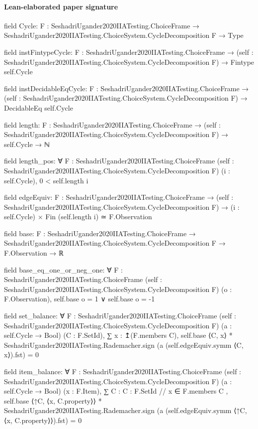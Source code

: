 \documentclass[10pt]{article}
\begin{document}
\paragraph{Lean-elaborated paper signature}
\begin{ReviewVerbatim}
field Cycle:
{F : SeshadriUgander2020IIATesting.ChoiceFrame} → SeshadriUgander2020IIATesting.ChoiceSystem.CycleDecomposition F → Type

field instFintypeCycle:
{F : SeshadriUgander2020IIATesting.ChoiceFrame} →
  (self : SeshadriUgander2020IIATesting.ChoiceSystem.CycleDecomposition F) → Fintype self.Cycle

field instDecidableEqCycle:
{F : SeshadriUgander2020IIATesting.ChoiceFrame} →
  (self : SeshadriUgander2020IIATesting.ChoiceSystem.CycleDecomposition F) → DecidableEq self.Cycle

field length:
{F : SeshadriUgander2020IIATesting.ChoiceFrame} →
  (self : SeshadriUgander2020IIATesting.ChoiceSystem.CycleDecomposition F) → self.Cycle → ℕ

field length_pos:
∀ {F : SeshadriUgander2020IIATesting.ChoiceFrame}
  (self : SeshadriUgander2020IIATesting.ChoiceSystem.CycleDecomposition F) (i : self.Cycle), 0 < self.length i

field edgeEquiv:
{F : SeshadriUgander2020IIATesting.ChoiceFrame} →
  (self : SeshadriUgander2020IIATesting.ChoiceSystem.CycleDecomposition F) →
    (i : self.Cycle) × Fin (self.length i) ≃ F.Observation

field base:
{F : SeshadriUgander2020IIATesting.ChoiceFrame} →
  SeshadriUgander2020IIATesting.ChoiceSystem.CycleDecomposition F → F.Observation → ℝ

field base_eq_one_or_neg_one:
∀ {F : SeshadriUgander2020IIATesting.ChoiceFrame}
  (self : SeshadriUgander2020IIATesting.ChoiceSystem.CycleDecomposition F) (o : F.Observation),
  self.base o = 1 ∨ self.base o = -1

field set_balance:
∀ {F : SeshadriUgander2020IIATesting.ChoiceFrame}
  (self : SeshadriUgander2020IIATesting.ChoiceSystem.CycleDecomposition F) (a : self.Cycle → Bool) (C : F.SetId),
  ∑ x : ↥(F.members C),
      self.base ⟨C, x⟩ * SeshadriUgander2020IIATesting.Rademacher.sign (a (self.edgeEquiv.symm ⟨C, x⟩).fst) =
    0

field item_balance:
∀ {F : SeshadriUgander2020IIATesting.ChoiceFrame}
  (self : SeshadriUgander2020IIATesting.ChoiceSystem.CycleDecomposition F) (a : self.Cycle → Bool) (x : F.Item),
  ∑ C : { C : F.SetId // x ∈ F.members C },
      self.base ⟨↑C, ⟨x, C.property⟩⟩ *
        SeshadriUgander2020IIATesting.Rademacher.sign (a (self.edgeEquiv.symm ⟨↑C, ⟨x, C.property⟩⟩).fst) =
    0
\end{ReviewVerbatim}
\end{document}
